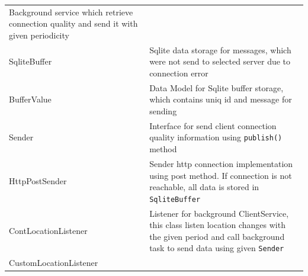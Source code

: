 \begin{longtable}[]{@{}ll@{}}
\begin{minipage}[t]{0.6\columnwidth}
Background service which retrieve connection quality and send it with
given periodicity\strut
\end{minipage}\tabularnewline
\begin{minipage}[t]{0.3\columnwidth}\raggedright
SqliteBuffer\strut
\end{minipage} & \begin{minipage}[t]{0.6\columnwidth}\raggedright
Sqlite data storage for messages, which were not send to selected server
due to connection error\strut
\end{minipage}\tabularnewline
\begin{minipage}[t]{0.3\columnwidth}\raggedright
BufferValue\strut
\end{minipage} & \begin{minipage}[t]{0.6\columnwidth}\raggedright
Data Model for Sqlite buffer storage, which contains uniq id and message
for sending\strut
\end{minipage}\tabularnewline
\begin{minipage}[t]{0.3\columnwidth}\raggedright
Sender\strut
\end{minipage} & \begin{minipage}[t]{0.6\columnwidth}\raggedright
Interface for send client connection quality information using
\texttt{publish()} method\strut
\end{minipage}\tabularnewline
\begin{minipage}[t]{0.3\columnwidth}\raggedright
HttpPostSender\strut
\end{minipage} & \begin{minipage}[t]{0.6\columnwidth}\raggedright
Sender http connection implementation using post method. If connection
is not reachable, all data is stored in \texttt{SqliteBuffer}\strut
\end{minipage}\tabularnewline
\begin{minipage}[t]{0.3\columnwidth}\raggedright
ContLocationListener\strut
\end{minipage} & \begin{minipage}[t]{0.6\columnwidth}\raggedright
Listener for background ClientService, this class listen location
changes with the given period and call background task to send data
using given \texttt{Sender}\strut
\end{minipage}\tabularnewline
\begin{minipage}[t]{0.3\columnwidth}\raggedright
CustomLocationListener\strut
\end{minipage} & \begin{minipage}[t]{0.6\columnwidth}\raggedright

\end{minipage}
\end{longtable}
